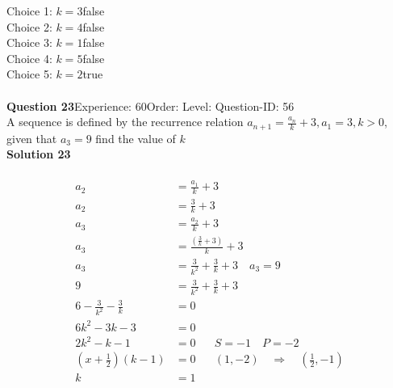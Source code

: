 \documentclass{article}
\begin{document}
Choice 1: \hspace{20pt}$k=3$\hspace{20pt}false\\
Choice 2: \hspace{20pt}$k=4$\hspace{20pt}false\\
Choice 3: \hspace{20pt}$k=1$\hspace{20pt}false\\
Choice 4: \hspace{20pt}$k=5$\hspace{20pt}false\\
Choice 5: \hspace{20pt}$k=2$\hspace{20pt}true\\
\\[4pt]
\noindent\textbf{Question 23}\hspace{20pt}Experience: 60\hspace{20pt}Order: \hspace{20pt}Level: \hspace{20pt}Question-ID: 56\\[2pt]
A sequence is defined by the recurrence relation $a_{n+1}=\displaystyle\frac{a_n}{k}+3, a_1=3,k>0$, given that $a_3=9$ find the value of $k$\\[4pt]
\noindent\textbf{Solution 23}\\[2pt]
\\[-35pt]\begin{align*}
a_2&=\displaystyle\frac{a_1}{k}+3\\[2pt]
a_2&=\displaystyle\frac{3}{k}+3\\[12pt]
a_3&=\displaystyle\frac{a_2}{k}+3\\[2pt]
a_3&=\displaystyle\frac{\left(\displaystyle\frac{3}{k}+3\right)}{k}+3\\[2pt]
a_3&=\displaystyle\frac{3}{k^2}+\frac{3}{k}+3\quad a_3=9\\[12pt]
9&=\displaystyle\frac{3}{k^2}+\frac{3}{k}+3\\[2pt]
6-\displaystyle\frac{3}{k^2}-\frac{3}{k}&=0\\[2pt]
6k^2-3k-3&=0\\[2pt]
2k^2-k-1&=0\hspace{20pt}S=-1\quad P=-2\\[2pt]
\left(x+\displaystyle\frac{1}{2}\right)(k-1)&=0\hspace{20pt} (1,-2) \quad \Rightarrow \quad \left(\displaystyle\frac{1}{2},-1\right)\\[2pt]
k&=1\\
\end{align*}
\end{document}

